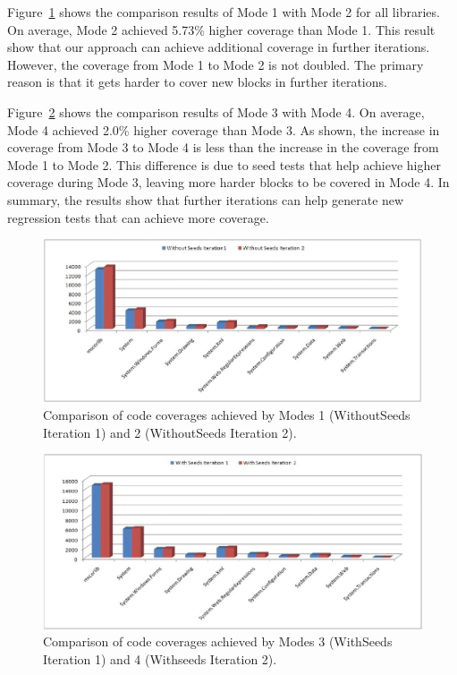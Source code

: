 Figure~\ref{fig:rq41} shows the comparison results of Mode 1 with Mode 2 for all libraries. On average, Mode 2 achieved 5.73\% higher coverage than Mode 1. This result show
that our approach can achieve additional coverage in further iterations. However, the coverage from Mode 1 to Mode 2 is not doubled. The primary reason is that it gets harder to cover new blocks in further iterations.

Figure~\ref{fig:rq42} shows the comparison results of Mode 3 with Mode 4. On average, Mode 4 achieved 2.0\% higher coverage than Mode 3. As shown, the increase in coverage from Mode 3 to Mode 4 is less than the increase in the coverage from Mode 1 to Mode 2. This difference is due to seed tests that help achieve higher coverage during Mode 3, leaving more harder blocks to be covered in Mode 4. In summary, the results show that further iterations can help generate new regression tests that can achieve more coverage.

\begin{figure}[t]
\centering
\includegraphics[scale=0.70,clip]{figs/RQ4_1_1.eps}\vspace*{-1ex}
\caption{\label{fig:rq41}Comparison of code coverages achieved by Modes 1 (WithoutSeeds Iteration 1) and 2 (WithoutSeeds Iteration 2).} 
\end{figure}


\begin{figure}[t]
\centering
\includegraphics[scale=0.70,clip]{figs/RQ4_2_1.eps}\vspace*{-1ex}
\caption{\label{fig:rq42}Comparison of code coverages achieved by Modes 3 (WithSeeds Iteration 1) and 4 (Withseeds Iteration 2).}
\end{figure}

